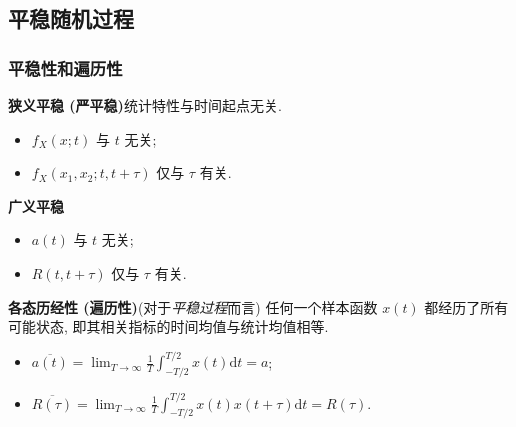 \subsection{平稳随机过程}
\subsubsection{平稳性和遍历性}
\textbf{狭义平稳 (严平稳)}\quad 统计特性与时间起点无关.
\begin{itemize}
    \item $f_X(x;t)$ 与 $t$ 无关;
    \item $f_X(x_1,x_2;t,t+\tau)$ 仅与 $\tau$ 有关.
\end{itemize}

\textbf{广义平稳}
\begin{itemize}
    \item $a(t)$ 与 $t$ 无关;
    \item $R(t,t+\tau)$ 仅与 $\tau$ 有关.
\end{itemize}

\textbf{各态历经性 (遍历性)}\quad (对于\textit{平稳过程}而言) 任何一个样本函数 $x(t)$ 都经历了所有可能状态, 即其相关指标的时间均值与统计均值相等.
\begin{itemize}
    \item $\overline{a(t)}=\displaystyle\lim_{T\rightarrow\infty}\frac{1}{T}\int_{-T/2}^{T/2}x(t)\mathrm{d}t=a$;
    \item $\overline{R(\tau)}=\displaystyle\lim_{T\rightarrow\infty}\frac{1}{T}\int_{-T/2}^{T/2}x(t)x(t+\tau)\mathrm{d}t=R(\tau)$.
\end{itemize}

